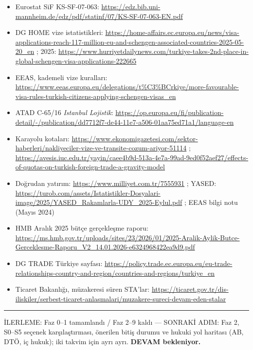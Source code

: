 \begin{itemize}
\item
  Eurostat SiF KS-SF-07-063: \url{https://edz.bib.uni-mannheim.de/edz/pdf/statinf/07/KS-SF-07-063-EN.pdf}
\item
  DG HOME vize istatistikleri: \url{https://home-affairs.ec.europa.eu/news/visa-applications-reach-117-million-eu-and-schengen-associated-countries-2025-05-20_en} ; 2025: \url{https://www.hurriyetdailynews.com/turkiye-takes-2nd-place-in-global-schengen-visa-applications-222665}
\item
  EEAS, kademeli vize kuralları: \url{https://www.eeas.europa.eu/delegations/t\%C3\%BCrkiye/more-favourable-visa-rules-turkish-citizens-applying-schengen-visas_en}
\item
  ATAD C-65/16 \emph{Istanbul Lojistik}: \url{https://op.europa.eu/fi/publication-detail/-/publication/dd7712f7-de44-11e7-a506-01aa75ed71a1/language-en}
\item
  Karayolu kotaları: \url{https://www.ekonomigazetesi.com/sektor-haberleri/nakliyeciler-vize-ve-transite-cozum-ariyor-51114} ; \url{https://avesis.iuc.edu.tr/yayin/caee4b9d-513a-4e7a-99ad-9ed0f52aef27/effects-of-quotas-on-turkish-foreign-trade-a-gravity-model}
\item
  Doğrudan yatırım: \url{https://www.milliyet.com.tr/7555931} ; YASED: \url{https://turob.com/assets/Istatistikler-Dosyalari-image/2025/YASED_Rakamlarla-UDY_2025-Eylul.pdf} ; EEAS bilgi notu (Mayıs 2024)
\item
  HMB Aralık 2025 bütçe gerçekleşme raporu: \url{https://ms.hmb.gov.tr/uploads/sites/23/2026/01/2025-Aralik-Aylik-Butce-Gerceklesme-Raporu_V2_14.01.2026-e6324968422ea9d9.pdf}
\item
  DG TRADE Türkiye sayfası: \url{https://policy.trade.ec.europa.eu/eu-trade-relationships-country-and-region/countries-and-regions/turkiye_en}
\item
  Ticaret Bakanlığı, müzakeresi süren STA'lar: \url{https://ticaret.gov.tr/dis-iliskiler/serbest-ticaret-anlasmalari/muzakere-sureci-devam-eden-stalar}
\end{itemize}

\begin{center}\rule{0.5\linewidth}{0.5pt}\end{center}

\begin{gbilerleme}

İLERLEME: Faz 0--1 tamamlandı / Faz 2--9 kaldı --- SONRAKİ ADIM: Faz 2, S0--S5 seçenek karşılaştırması, önerilen bitiş durumu ve hukuki yol haritası (AB, DTÖ, iç hukuk); iki takvim için ayrı ayrı. \textbf{DEVAM bekleniyor.}

\end{gbilerleme}
